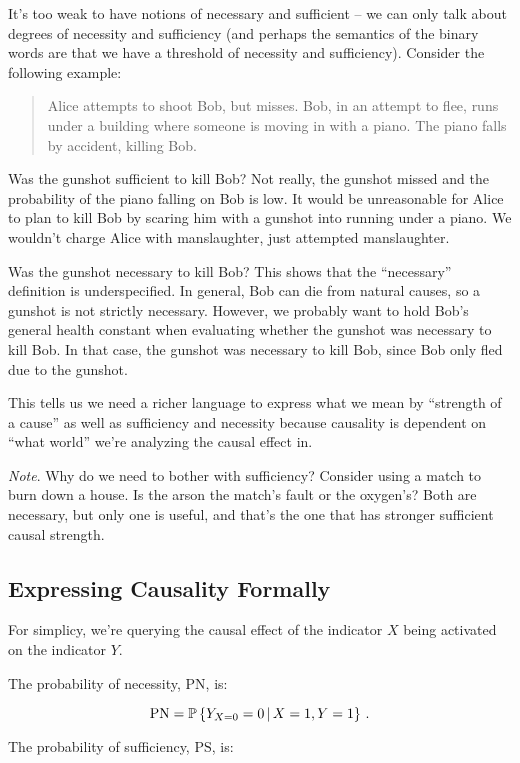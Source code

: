 \documentclass{article}
\begin{document}
It's too weak to have notions of necessary and sufficient -- we can only talk about degrees of necessity and sufficiency (and perhaps the semantics of the binary words are that we have a threshold of necessity and sufficiency). Consider the following example:

\begin{quote}
  Alice attempts to shoot Bob, but misses. Bob, in an attempt to flee, runs under a building where someone is moving in with a piano. The piano falls by accident, killing Bob.
\end{quote}

Was the gunshot sufficient to kill Bob? Not really, the gunshot missed and the probability of the piano falling on Bob is low. It would be unreasonable for Alice to plan to kill Bob by scaring him with a gunshot into running under a piano. We wouldn't charge Alice with manslaughter, just attempted manslaughter.

Was the gunshot necessary to kill Bob? This shows that the ``necessary'' definition is underspecified. In general, Bob can die from natural causes, so a gunshot is not strictly necessary. However, we probably want to hold Bob's general health constant when evaluating whether the gunshot was necessary to kill Bob. In that case, the gunshot was necessary to kill Bob, since Bob only fled due to the gunshot.

This tells us we need a richer language to express what we mean by ``strength of a cause'' as well as sufficiency and necessity because causality is dependent on ``what world'' we're analyzing the causal effect in.

\textit{Note}. Why do we need to bother with sufficiency? Consider using a match to burn down a house. Is the arson the match's fault or the oxygen's? Both are necessary, but only one is useful, and that's the one that has stronger sufficient causal strength.

\subsection{Expressing Causality Formally}

For simplicy, we're querying the causal effect of the indicator $X$ being activated on the indicator $Y$.

The probability of necessity, $\textrm{PN}$, is:

$$
\textrm{PN}=\operatorname{\mathbb{P}}\left\{ Y_{X=0}=0 \,\middle|\, X=1,Y=1 \right\}\,.
$$

The probability of sufficiency, $\textrm{PS}$, is:
\end{document}
